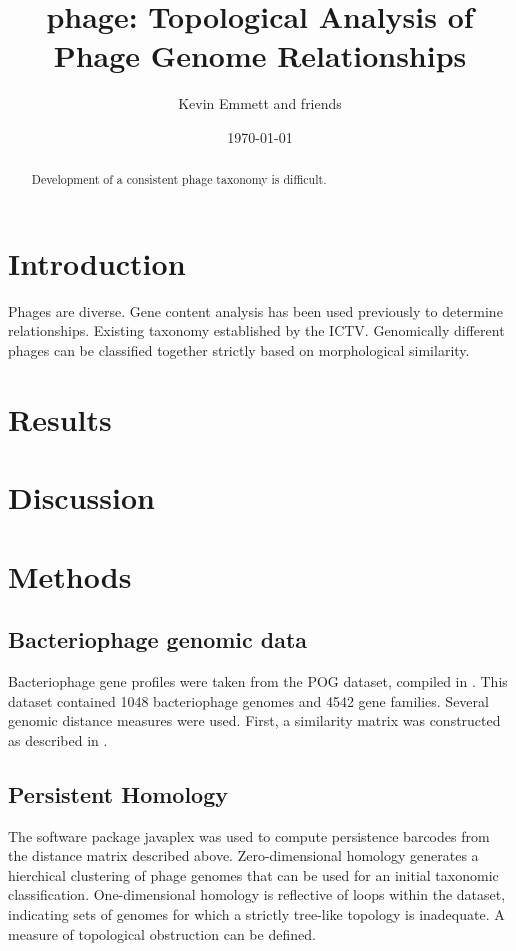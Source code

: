 \documentclass[12pt]{article}
\title{phage: Topological Analysis of Phage Genome Relationships}
\author{Kevin Emmett and friends}
\date{\today}
\begin{document}
\maketitle

\begin{abstract}
Development of a consistent phage taxonomy is difficult.
\end{abstract}

\section*{Introduction}
Phages are diverse.
Gene content analysis has been used previously to determine relationships.
Existing taxonomy established by the ICTV.
Genomically different phages can be classified together strictly based on morphological similarity.

\section*{Results}

\section*{Discussion}

\section*{Methods}

\subsection*{Bacteriophage genomic data}
Bacteriophage gene profiles were taken from the POG dataset, compiled in \cite{Kristensen13}.
This dataset contained 1048 bacteriophage genomes and 4542 gene families.
Several genomic distance measures were used.
First, a similarity matrix was constructed as described in \cite{LimaMendez08}.

\subsection*{Persistent Homology}
The software package javaplex was used to compute persistence barcodes from the distance matrix described above.
Zero-dimensional homology generates a hierchical clustering of phage genomes that can be used for an initial taxonomic classification.
One-dimensional homology is reflective of loops within the dataset, indicating sets of genomes for which a strictly tree-like topology is inadequate.
A measure of topological obstruction can be defined.
\end{document}

